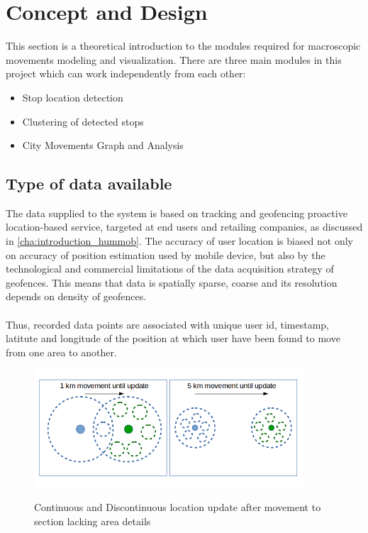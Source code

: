 \chapter{Concept and Design}
\label{cha:conceptanddesign}

This section is a theoretical introduction to the modules required for macroscopic movements modeling and visualization. There are three main modules in this project which can work independently from each other:

\begin{itemize}  
\item Stop location detection
\item Clustering of detected stops 
\item City Movements Graph and Analysis
\end{itemize}

\section{Type of data available}

The data supplied to the system is based on tracking and geofencing proactive location-based
service, targeted at end users and retailing companies, as discussed in \ref{cha:introduction_hummob}. The accuracy of user location is biased not only on accuracy of position estimation used by mobile device, but also by the technological and commercial limitations of the data acquisition strategy of geofences. This means that data is spatially sparse, coarse and its resolution depends on density of geofences.
\\\\
Thus, recorded data points are associated with unique user id, timestamp, latitute and longitude of the position at which user have been found to move from one area to another.

\begin{figure}[!ht]
	\centering
	\includegraphics[width=0.9\textwidth]{images/movement_update.png}\\
	\caption{Continuous and Discontinuous location update after movement to section lacking area details }
	\label{fig:movement_update}
\end{figure}
\FloatBarrier

